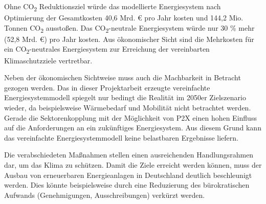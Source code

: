 Ohne CO\textsubscript{2} Reduktionsziel würde das modellierte Energiesystem nach Optimierung der Gesamtkosten 40,6 Mrd. € pro Jahr kosten und 144,2 Mio. Tonnen CO\textsubscript{2} ausstoßen. Das CO\textsubscript{2}-neutrale Energiesystem würde nur 30 \% mehr (52,8 Mrd. €) pro Jahr kosten. 
Aus ökonomischer Sicht sind die Mehrkosten für ein CO\textsubscript{2}-neutrales Energiesystem zur Erreichung der vereinbarten Klimaschutzziele vertretbar.

Neben der ökonomischen Sichtweise muss auch die Machbarkeit in Betracht gezogen werden.
Das in dieser Projektarbeit erzeugte vereinfachte Energiesystemmodell spiegelt nur bedingt die Realität im 2050er Zielszenario wieder, da beispielsweise Wärmebedarf und Mobilität nicht betrachtet werden. Gerade die Sektorenkopplung mit der Möglichkeit von P2X einen hohen Einfluss auf die Anforderungen an ein zukünftiges Energiesystem. Aus diesem Grund kann das vereinfachte Energiesystemmodell keine belastbaren Ergebnisse liefern.

Die verabschiedeten Maßnahmen stellen einen ausreichenden Handlungsrahmen dar, um das Klima zu schützen. Damit die Ziele erreicht werden können, muss der Ausbau von erneuerbaren Energieanlagen in Deutschland deutlich beschleunigt werden. Dies könnte beispielsweise durch eine Reduzierung des bürokratischen Aufwands (Genehmigungen, Ausschreibungen) verkürzt werden.